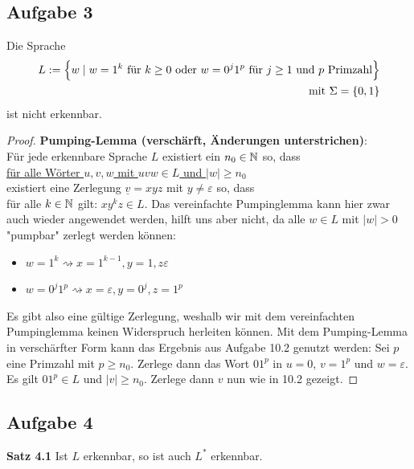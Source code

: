 \subsection{Aufgabe 3}
Die Sprache
\begin{align*}
	L:=\Big\lbrace w\mid w=1^k\text{ für }k\geq0\text{ oder }w=0^j1^p\text{ für }j\geq1\text{ und }p\text{ Primzahl}\Big\rbrace\\
	\mit\Sigma=\lbrace0,1\rbrace
\end{align*}
ist nicht erkennbar.

\begin{proof}
	\textbf{Pumping-Lemma (verschärft, Änderungen unterstrichen)}:\\
	Für jede erkennbare Sprache $L$ existiert ein $n_0\in\N$ so, dass\\
	\underline{für alle Wörter $u,v,w$ mit $uvw\in L$ und $|w|\geq n_0$}\\
	existiert eine Zerlegung $\underline{v}=xyz$ mit $y\neq\varepsilon$ so, dass\\
	für alle $k\in\N$ gilt: $xy^kz\in L$.\nl
	Das vereinfachte Pumpinglemma kann hier zwar auch wieder angewendet werden, hilft uns aber nicht, da
	alle $w\in L$ mit $|w|>0$ "pumpbar" zerlegt werden können:
	\begin{itemize}
		\item $w=1^k\rightsquigarrow x=1^{k-1},y=1,z\varepsilon$
		\item $w=0^j 1^p\rightsquigarrow x=\varepsilon,y=0^j,z=1^p$
	\end{itemize}
	Es gibt also eine gültige Zerlegung, weshalb wir mit dem vereinfachten Pumpinglemma keinen Widerspruch herleiten können.
	Mit dem Pumping-Lemma in verschärfter Form kann das Ergebnis aus Aufgabe 10.2 genutzt werden:
	Sei $p$ eine Primzahl mit $p\geq n_0$. Zerlege dann das Wort $01^p$ in $u=0$, $v=1^p$ und $w=\varepsilon$.
	Es gilt $01^p\in L$ und $|v|\geq n_0$.
	Zerlege dann $v$ nun wie in 10.2 gezeigt.
\end{proof}

\subsection{Aufgabe 4}
\textbf{Satz 4.1} Ist $L$ erkennbar, so ist auch $L^\ast$ erkennbar.

